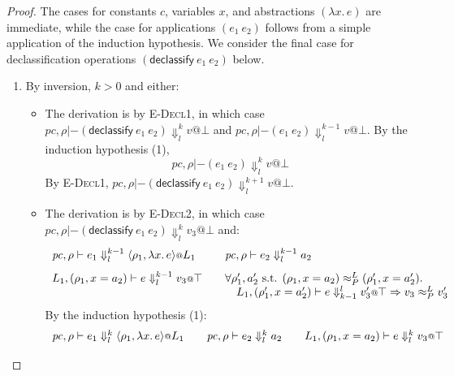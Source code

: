 \documentclass{article}
\makeatletter
\theoremstyle{definition}
\newcommand{\at}{\ensuremath{{\scriptstyle{@}}}}
\newcommand{\pc}{\ensuremath{{\mathit{pc}}}}
\makeatother
\begin{document}
\begin{proof}
  The cases for constants $c$, variables $x$, and abstractions
  $(\lambda{x}.\, e)$ are immediate, while the case for applications
  $(e_1\ e_2)$ follows from a simple application of the induction hypothesis.
  We consider the final case for declassification operations
  $(\mathsf{declassify}\ e_1\ e_2)$ below.
    \begin{enumerate}
    \item By inversion, $k > 0$ and either:
      \begin{itemize}
      \item The derivation is by \textsc{E-Decl1}, in which case
        $\pc, \rho |- (\mathsf{declassify}\ e_1\ e_2)
        \Downarrow^{k}_{l}
        v \at \bot$ and
        $\pc, \rho |- (e_1\ e_2) \Downarrow^{k-1}_{l} v \at \bot$.
        By the induction hypothesis (1),
        \[
        \pc, \rho |- (e_1\ e_2) \Downarrow^{k}_{l} v \at \bot
        \]
        By \textsc{E-Decl1},
        $\pc, \rho |- (\mathsf{declassify}\ e_1\ e_2) \Downarrow^{k+1}_{l}
        v \at \bot$.
      \item The derivation is by \textsc{E-Decl2}, in which case
        $\pc, \rho |- (\mathsf{declassify}\ e_1\ e_2)
        \Downarrow^{k}_{l}
        v_3 \at \bot$ and:
        \[
        {\begin{array}{l@{\qquad}l}
            \pc, \rho |- e_1
            \Downarrow^{k-1}_{l}
            \langle{\rho_1, \lambda{x}.\, e\rangle} \at L_1
            &
            \pc, \rho |- e_2
            \Downarrow^{k-1}_{l}
            a_2
            \\[1.8ex]
            L_1, (\rho_1, x = a_2) |- e
            \Downarrow^{k-1}_{l}
            v_3 \at \top
            &
            \forall{\rho_1', a_2' \text{ s.t. }
              (\rho_1, x = a_2) \approx^{L}_{P} (\rho_1', x = a_2')}.
            \\ & \quad
            L_1, (\rho_1', x = a_2') |- e \Downarrow^{l}_{k-1} v_3' \at \top =>
            v_3 \approx^{L}_{P} v_3'
          \end{array}}
        \]
        By the induction hypothesis (1):
        \[
        {\begin{array}{l@{\qquad}l@{\qquad}l}
            \pc, \rho |- e_1
            \Downarrow^{k}_{l}
            \langle{\rho_1, \lambda{x}.\, e\rangle} \at L_1
            &
            \pc, \rho |- e_2
            \Downarrow^{k}_{l}
            a_2
            &
            L_1, (\rho_1, x = a_2) |- e
            \Downarrow^{k}_{l}
            v_3 \at \top
          \end{array}}
\]
\end{itemize}
\end{enumerate}
\end{proof}
\end{document}
